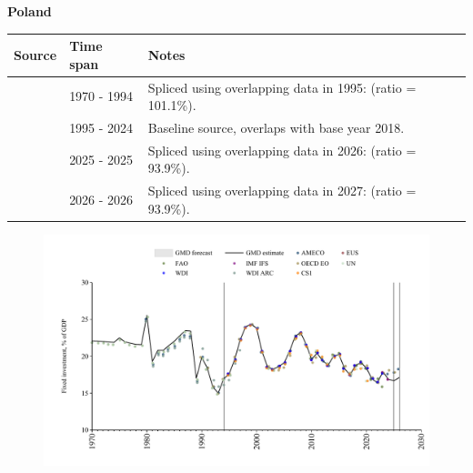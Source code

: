 \documentclass[12pt,a4paper,landscape]{article}
\begin{document}
\begin{adjustbox}{max totalsize={\paperwidth}{\paperheight},center}
\begin{minipage}[t][\textheight][t]{\textwidth}
\vspace*{0.5cm}
{}
\begin{center}
{\Large\bfseries Poland}
\end{center}
\vspace{0.5cm}
\begin{table}[H]
\centering
\small
\begin{tabular}{|l|l|l|}
\hline
\textbf{Source} & \textbf{Time span} & \textbf{Notes} \\
\hline
\rowcolor{white}\cite{UN}& 1970 - 1994 &Spliced using overlapping data in 1995: (ratio = 101.1\%).\\
\rowcolor{lightgray}\cite{EUS}& 1995 - 2024 &Baseline source, overlaps with base year 2018.\\
\rowcolor{white}\cite{OECD_EO}& 2025 - 2025 &Spliced using overlapping data in 2026: (ratio = 93.9\%).\\
\rowcolor{lightgray}\cite{AMECO}& 2026 - 2026 &Spliced using overlapping data in 2027: (ratio = 93.9\%).\\
\hline
\end{tabular}
\end{table}
\begin{figure}[H]
\centering
\includegraphics[width=\textwidth,height=0.6\textheight,keepaspectratio]{graphs/POL_finv_GDP.pdf}
\end{figure}
\end{minipage}
\end{adjustbox}
\end{document}
